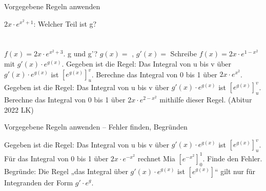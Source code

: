 \setcounter{aufgabe}{6}

\begin{aufgabe}{Vorgegebene Regeln anwenden}
\begin{teile}
\teil $2x \cdot e^{x^2 + 1}$: Welcher Teil ist g?\\ \\ \\ 
\teil $f(x) = 2x \cdot e^{x^2 + 3}$. g und g'? $g(x) = $ \leerfeld, $g'(x) = $ \leerfeld
\teil Schreibe $f(x) = 2x \cdot e^{1 - x^2}$ mit $g'(x) \cdot e^{g(x)}$. \leerfeld
\teil Gegeben ist die Regel: Das Integral von u bis v über $g'(x) \cdot e^{g(x)}$ ist $\left[e^{g(x)}\right]_u^v$. Berechne das Integral von 0 bis 1 über $2x \cdot e^{x^2}$. \leerfeld
\teil Gegeben ist die Regel: Das Integral von u bis v über $g'(x) \cdot e^{g(x)}$ ist $\left[e^{g(x)}\right]_u^v$. Berechne das Integral von 0 bis 1 über $2x \cdot e^{2 - x^2}$ mithilfe dieser Regel. \hfill (Abitur 2022 LK) \\ \leerfeld
\end{teile}
\end{aufgabe}

\begin{aufgabe}{Vorgegebene Regeln anwenden – Fehler finden, Begründen}
\begin{teile}
\teil Gegeben ist die Regel: Das Integral von u bis v über $g'(x) \cdot e^{g(x)}$ ist $\left[e^{g(x)}\right]_u^v$. Für das Integral von 0 bis 1 über $2x \cdot e^{-x^2}$ rechnet Mia $\left[e^{-x^2}\right]_0^1$. Finde den Fehler.
\teil Begründe: Die Regel „das Integral über $g'(x) \cdot e^{g(x)}$ ist $\left[e^{g(x)}\right]$“ gilt nur für Integranden der Form $g' \cdot e^g$.
\end{teile}
\end{aufgabe}
